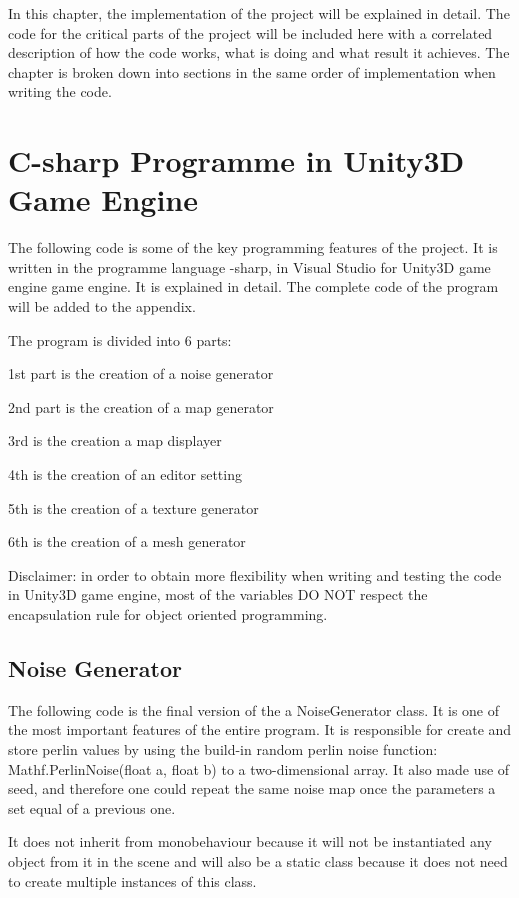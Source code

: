 \documentclass[a4paper,12pt]{book}
\begin{document}
In this chapter, the implementation of the project will be explained in detail. The code for the critical parts of the project will be included here with a correlated description of how the code works, what is doing and what result it achieves.
The chapter is broken down into sections in the same order of implementation when writing the code.


\section{C-sharp Programme in Unity3D Game Engine}

The following code is some of the key programming features of the project. It is written in the programme language -sharp, in Visual Studio for Unity3D game engine game engine. It is explained in detail. The complete code of the program will be added to the appendix.

The program is divided into 6 parts: 

1st part is the creation of a noise generator

2nd part is the creation of a map generator

3rd is the creation a map displayer

4th is the creation of an editor setting

5th is the creation of a texture generator

6th is the creation of a mesh generator


Disclaimer: in order to obtain more flexibility when writing and testing the code in Unity3D game engine, most of the variables DO NOT respect the encapsulation rule for object oriented programming. 

 
\subsection{Noise Generator}

The following code is the final version of the a NoiseGenerator class. It is one of the most important features of the entire program. It is responsible for create and store perlin values by using the build-in random perlin noise function: Mathf.PerlinNoise(float a, float b) to a two-dimensional array. It also made use of seed, and therefore one could repeat the same noise map once the parameters a set equal of a previous one.

It does not inherit from monobehaviour because it will not be instantiated any object from it in the scene and will also be a static class because it does not need to create multiple instances of this class.
\end{document}
